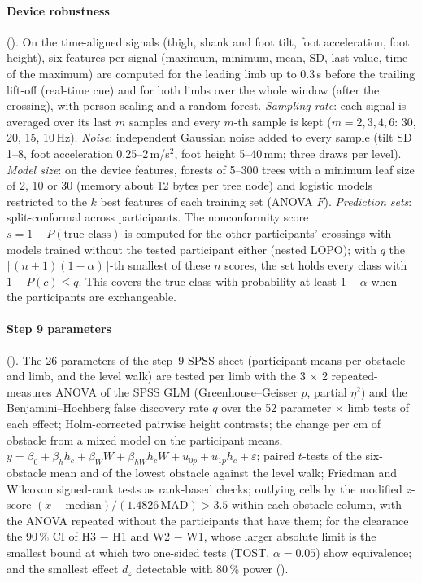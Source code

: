 \paragraph{Device robustness} (). On the time-aligned signals (thigh, shank and foot tilt, foot
acceleration, foot height), six features per signal (maximum, minimum, mean, SD, last value, time of the maximum) are computed
for the leading limb up to 0.3\,s before the trailing lift-off (real-time cue) and for both limbs over the whole window (after the
crossing), with person scaling and a random forest. \emph{Sampling rate}: each signal is averaged over its last $m$ samples and
every $m$-th sample is kept ($m = 2, 3, 4, 6$: 30, 20, 15, 10\,Hz). \emph{Noise}: independent Gaussian noise added to every
sample (tilt SD 1--8\textdegree{}, foot acceleration 0.25--2\,m/s$^2$, foot height 5--40\,mm; three draws per level).
\emph{Model size}: on the device features, forests of 5--300 trees with a minimum leaf size of 2, 10 or 30 (memory about 12
bytes per tree node) and logistic models restricted to the $k$ best features of each training set (ANOVA $F$).
\emph{Prediction sets}: split-conformal across participants. The nonconformity score $s = 1 - P(\text{true class})$ is computed for
the other participants' crossings with models trained without the tested participant either (nested LOPO); with $q$ the
$\lceil (n+1)(1-\alpha) \rceil$-th smallest of these $n$ scores, the set holds every class with $1 - P(c) \le q$. This covers the
true class with probability at least $1-\alpha$ when the participants are exchangeable.

\paragraph{Step 9 parameters} (). The 26 parameters of the step~9 SPSS sheet (participant means per obstacle
and limb, and the level walk) are tested per limb with the 3 $\times$ 2 repeated-measures ANOVA of the SPSS GLM (Greenhouse--Geisser
$p$, partial $\eta^2$) and the Benjamini--Hochberg false discovery rate $q$ over the 52 parameter $\times$ limb tests of each effect;
Holm-corrected pairwise height contrasts; the change per cm of obstacle from a mixed model on the participant means,
$y = \beta_0 + \beta_h h_c + \beta_W W + \beta_{hW} h_c W + u_{0p} + u_{1p} h_c + \varepsilon$; paired $t$-tests of the six-obstacle mean
and of the lowest obstacle against the level walk; Friedman and Wilcoxon signed-rank tests as rank-based checks; outlying cells by
the modified $z$-score $(x - \text{median}) / (1.4826\,\text{MAD}) > 3.5$ within each obstacle column, with the ANOVA repeated
without the participants that have them; for the clearance the 90\,\% CI of H3 $-$ H1 and W2 $-$ W1, whose larger absolute limit is
the smallest bound at which two one-sided tests (TOST, $\alpha = 0.05$) show equivalence; and the smallest effect $d_z$ detectable
with 80\,\% power ().
